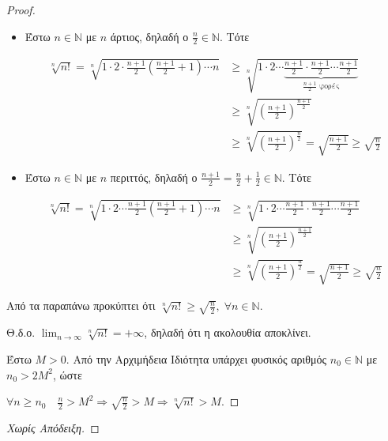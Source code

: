 \documentclass[main.tex]{subfiles}
\begin{document}
\begin{proof}
\item {}
    \begin{itemize}
        \item 
            Έστω $ n \in \mathbb{N} $ με $ n $ άρτιος, δηλαδή ο 
            $ \frac{n}{2} \in \mathbb{N} $. Τότε

            \begin{align*}
                \sqrt[n]{n!} = \sqrt[n]{1 \cdot 2 \cdot \frac{n+1}{2}
                \left(\frac{n+1}{2} +1\right) \cdots n} 
                    &\geq \sqrt[n]{1\cdot 2 \cdots
                        \underbrace{\frac{n+1}{2} \cdot \frac{n+1}{2} 
                            \cdots \frac{n+1}{2}}_{\frac{n+1}{2} \; 
                    \text{φορές}}} \\
                    &\geq \sqrt[n]{\left(\frac{n+1}{2}\right)^
                    {\frac{n+1}{2}}} \\ 
                    &\geq \sqrt[n]{\left(\frac{n+1}{2}\right)^
                    {\frac{n}{2}}} = \sqrt{ \frac{n+1}{2} } \geq 
                    \sqrt{\frac{n}{2}} 
            \end{align*} 

        \item Έστω $ n \in \mathbb{N} $ με $ n $ περιττός, δηλαδή ο $
            \frac{n+1}{2} = \frac{n}{2} + \frac{1}{2} \in \mathbb{N} $.
            Τότε

            \begin{align*}
                \sqrt[n]{n!} = \sqrt[n]{1\cdot 2 \cdots \frac{n+1}{2}
                \left(\frac{n+1}{2} +1\right) \cdots n}
             &\geq \sqrt[n]{1 \cdot 2 \cdots
             \frac{n+1}{2}  \cdot \frac{n+1}{2} \cdots \frac{n+1}{2} } \\ 
             &\geq 
             \sqrt[n]{\left(\frac{n+1}{2} \right)^{\frac{n+1}{2}}} \\ 
             & \geq
             \sqrt[n]{\left(\frac{n+1}{2} \right)^{\frac{n}{2}}} = 
             \sqrt{\frac{n+1}{2}} \geq 
             \sqrt{\frac{n}{2}}
            \end{align*}
    \end{itemize}

    Από τα παραπάνω προκύπτει ότι $ \sqrt[n]{n!} \geq \sqrt{\frac{n}{2}
    }, \; \forall n \in \mathbb{N} $. 

    Θ.δ.ο. $ \lim_{n \to \infty} \sqrt[n]{n!} = + \infty $, 
    δηλαδή ότι η ακολουθία αποκλίνει.

    Έστω $ M >0 $. Από την Αρχιμήδεια Ιδιότητα υπάρχει 
    φυσικός αριθμός $ 
    n_{0} \in  \mathbb{N} $ με $ n_{0}>2M^{2} $, ώστε 

    $ \forall n \geq n_{0} \quad \frac{n}{2} > M^{2} \Rightarrow
    \sqrt{\frac{n}{2}} > M \Rightarrow \sqrt[n]{n!} > M $. 
\end{proof}




\begin{proof}[Χωρίς Απόδειξη]
    
\end{proof}
\end{document}
